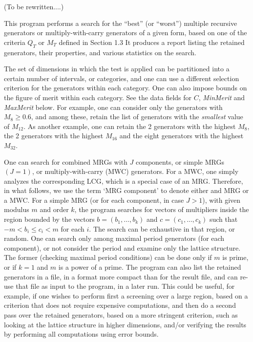 
(To be rewritten....)

This program performs a search for the ``best'' (or ``worst'') multiple
recursive generators or multiply-with-carry generators of a given
form, based on one of the criteria $Q_T$ or $M_T$ defined in Section 1.3
It produces a report listing the retained generators, their properties,
and various statistics on the search.

The set of dimensions in which the test is applied can be partitioned
into a certain number of intervals, or categories,
and one can use a different selection criterion for the generators within
each category.  One can also impose bounds on the figure of merit
within each category.  See the data fields for $C$, {\it MinMerit}
and {\it MaxMerit\/} below.
For example, one can consider only the generators with $M_8 \ge 0.6$,
and among these, retain the list of generators with the {\em smallest\/}
value of $M_{12}$.
As another example, one can retain the 2 generators with the highest $M_8$,
the 2 generators with the highest $M_{16}$ and the eight generators
with the highest $M_{32}$.

One can search for combined MRGs with $J$ components, or simple MRGs $(J=1)$,
or multiply-with-carry (MWC) generators.
For a MWC, one simply analyzes the corresponding LCG, which is a special
case of an MRG.  Therefore, in what follows, we use the term
`MRG component' to denote either and MRG or a MWC.
For a simple MRG (or for each component, in case $J > 1$), with
given modulus $m$ and order $k$, the program searches for vectors
of multipliers inside the
region bounded by the vectors $b = (b_1,\dots,b_k)$ and $c = (c_1,\dots,c_k)$
such that $-m < b_i\le c_i < m$ for each $i$.
The search can be exhaustive in that region, or random.
One can search only among maximal period generators (for each component),
or not consider the period and examine only the lattice structure.
The former (checking maximal period conditions) can be done only
if $m$ is prime, or if $k=1$ and $m$ is a power of a prime.
The program can also list the retained generators in a file, in a format
more compact than for the result file, and can re-use that file as input
to the program, in a later run.
This could be useful, for example, if one wishes to perform first a screening
over a large region, based on a criterion that does not require expensive
computations, and then do a second pass over the retained generators,
based on a more stringent criterion, such as looking at the lattice structure in
higher dimensions, and/or verifying the results by performing all computations
using error bounds.


